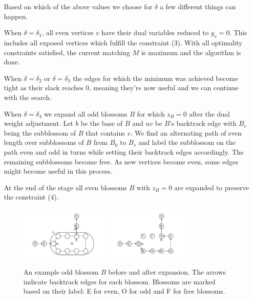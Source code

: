 Based on which of the above values we choose for $\delta$ a few different things can happen.

When $\delta = \delta_1$, all even vertices $v$ have their dual variables reduced to $y_v = 0$. This includes all exposed vertices which fulfill the constraint (3). With all optimality constraints satisfied, the current matching $M$ is maximum and the algorithm is done.

When $\delta = \delta_2$ or $\delta = \delta_3$ the edges for which the minimum was achieved become tight as their slack reaches $0$, meaning they're now useful and we can continue with the search.

When $\delta = \delta_4$ we expand all odd blossoms $B$ for which $z_B = 0$ after the dual weight adjustment. Let $b$ be the base of $B$ and $uv$ be $B$'s backtrack edge with $B_v$ being the subblossom of $B$ that contains $v$. We find an alternating path of even length over subblossoms of $B$ from $B_0$ to $B_v$ and label the subblossom on the path even and odd in turns while setting their backtrack edges accordingly. The remaining subblossoms become free. As new vertices become even, some edges might become useful in this process.

At the end of the stage all even blossoms $B$ with $z_B = 0$ are expanded to preserve the constraint (4).

\begin{figure}[t]
    \centering
    \includegraphics*[width=0.4\textwidth]{figures/Odd expansion.png}
    \includegraphics*[width=0.4\textwidth]{figures/Odd expanded.png}
    \caption{An example odd blossom $B$ before and after expansion. The arrows indicate backtrack edges for each blossom. Blossoms are marked based on their label: E for even, O for odd and F for free blossoms.}
\end{figure}


